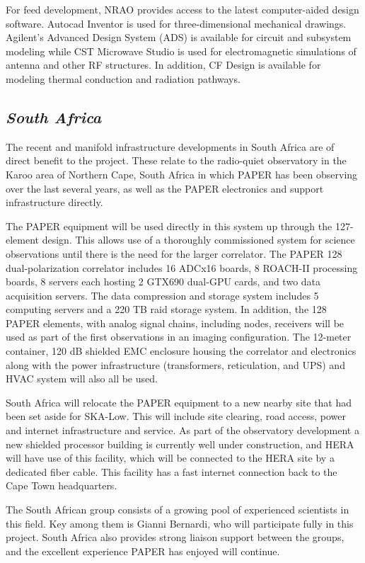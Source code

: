 \documentclass[11pt]{article}
\begin{document}
For feed development, NRAO provides access to the latest computer-aided design software. Autocad
Inventor is used for three-dimensional mechanical drawings. Agilent’s Advanced
Design System (ADS) is available for circuit and subsystem modeling while CST
Microwave Studio is used for electromagnetic simulations of antenna and other
RF structures. In addition, CF Design is available for modeling thermal
conduction and radiation pathways.

\subsection*{\it South Africa}

The recent and manifold infrastructure developments in South Africa are of direct benefit to the project.  These relate to the radio-quiet observatory in the Karoo area of Northern Cape, South Africa in which PAPER has been observing over the last several years, as well as the PAPER electronics and support infrastructure directly.

The PAPER equipment will be used directly in this system up through the 127-element design.  This allows use of a thoroughly commissioned system for science observations until there is the need for the larger correlator.  The PAPER 128 dual-polarization correlator includes 16 ADCx16 boards,  8 ROACH-II processing boards, 8 servers each hosting 2 GTX690 dual-GPU cards,
and two data acquisition servers.  The data compression and storage system includes 5 computing servers and a 220 TB raid storage system.  In addition, the 128 PAPER elements, with analog signal chains, including nodes, receivers will be used as part of the first observations in an imaging configuration. The 12-meter container, 120 dB shielded EMC enclosure housing the correlator and electronics along with the power infrastructure (transformers, reticulation, and UPS) and HVAC system will also all be used.

South Africa will relocate the PAPER equipment to a new nearby site that had been set aside for SKA-Low.  This will include site clearing, road access, power and internet infrastructure and service.  As part of the observatory development a new shielded processor building is currently well under construction, and HERA will have use of this facility, which will be connected to the HERA site by a dedicated fiber cable.  This facility has a fast internet connection back to the Cape Town headquarters.

The South African group consists of a growing pool of experienced scientists in this field.  Key among them is Gianni Bernardi, who will participate fully in this project.  South Africa also provides strong liaison support between the groups, and the excellent experience PAPER has enjoyed will continue.
\end{document}
